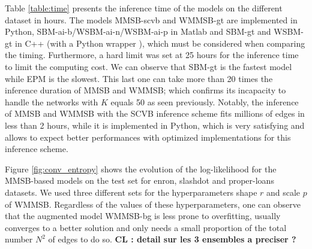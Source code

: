 \begin{table*}[t]
\centering
	
\label{table:time}
\end{table*}
Table \ref{table:time} presents the inference time of the models on the different dataset in hours. The models MMSB-scvb and WMMSB-gt are implemented in Python, SBM-ai-b/WSBM-ai-n/WSBM-ai-p in Matlab and SBM-gt and WSBM-gt in C++ (with a Python wrapper \cite{peixoto_graph-tool_2014}), which must be considered when comparing the timing. Furthermore, a hard limit  was set at 25 hours for the inference time to limit the computing cost. We can observe that SBM-gt is the fastest model while EPM is the slowest. This last one can take more than 20 times the inference duration of MMSB and WMMSB; which confirms its incapacity to handle the networks with $K$ equals 50 as seen previously. Notably, the inference of MMSB and WMMSB with the SCVB inference scheme fits millions of edges in less than 2 hours, while it is implemented in Python, which is very satisfying and allows to expect better performances  with optimized implementations for this inference scheme.



Figure \ref{fig:conv_entropy} shows the evolution of the log-likelihood for the MMSB-based models on the test set for enron, slashdot and proper-loans datasets. We used three different sets for the hyperparameters shape $r$ and scale $p$ of WMMSB. Regardless of the values of these hyperparameters, one can observe that the augmented model WMMSB-bg is less prone to overfitting, usually converges to a better solution and only needs a small proportion of the total number $N^2$ of edges to do so.
\textbf{CL : detail sur les 3 ensembles a preciser ?} 

\begin{figure*}[h]
\centering
	
    \label{fig:conv_entropy}
\end{figure*}







